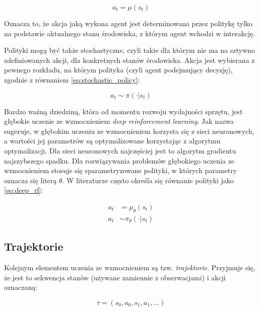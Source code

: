 \begin{equation}
	\label{eq:deterministic_policy}
	a_{t}=\mu(s_{t})
\end{equation}

Oznacza to, że akcja jaką wykona agent jest determinowana przez politykę tylko 
na podstawie aktualnego stanu środowiska, z którym agent wchodzi w interakcję.

Polityki mogą być także stochastyczne, czyli takie dla którym nie ma na sztywno 
zdefiniowanych akcji, dla konkretnych stanów środowiska. Akcja jest wybierana z 
pewnego rozkładu, na którym polityka (czyli agent podejmujący decyzję), zgodnie 
z równaniem \ref{eq:stochastic_policy}:

\begin{equation}
	\label{eq:stochastic_policy}
	a_{t}\sim\pi(\cdot|s_{t})
\end{equation}
 
Bardzo ważną dziedziną, która od momentu rozwoju wydajności sprzętu, jest 
głębokie uczenie ze wzmocnieniem \textit{deep reinforcement learning}. Jak 
nazwa sugeruje, w głębokim uczeniu ze wzmocnieniem korzysta się z sieci 
neuronowych, a wartości jej parametrów są optymalizowane korzystając z 
algorytmu optymalizacji. Dla sieci neuronowych najczęściej jest to algorytm 
gradientu najszybszego spadku. Dla rozwiązywania problemów głębokiego uczenia 
ze wzmocnieniem stosuje się sparametryzowane polityki, w których parametry 
oznacza się literą $\theta$. W literaturze często określa się równanie polityki 
jako \ref{eq:deep_rl}:

\begin{equation}
	\begin{aligned}
		\label{eq:deep_rl}
		a_t&=\mu_\theta(s_t)\\
		a_t&\sim\pi_\theta(\cdot|s_t)
	\end{aligned}
\end{equation}
 
\subsection{Trajektorie}
  
Kolejnym elementem uczenia ze wzmocnieniem są tzw. \textit{trajektorie}. 
Przyjmuje się, że jest to sekwencja stanów (używane zamiennie z obserwacjami) i 
akcji oznaczaną:

\begin{equation}
	\tau=(s_0, a_0, s_1, a_1,\dots)
\end{equation}


